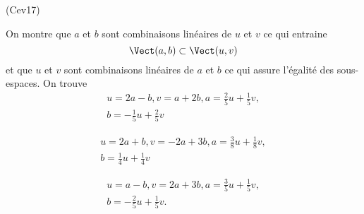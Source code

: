 \begin{tiny}(Cev17)\end{tiny} On montre que $a$ et $b$ sont combinaisons linéaires de $u$ et $v$ ce qui entraine 
\begin{displaymath}
 \Vect(a,b)\subset \Vect(u,v)
\end{displaymath}
et que $u$ et $v$ sont combinaisons linéaires de $a$ et $b$ ce qui assure l'égalité des sous-espaces. On trouve
\begin{multline*}
 u=2a-b, v=a+2b, 
a=\frac{2}{5}u+\frac{1}{5}v,\\ b=-\frac{1}{5}u+\frac{2}{5}v
\end{multline*}

\begin{multline*}
 u=2a+b, v=-2a+3b, 
a=\frac{3}{8}u+\frac{1}{8}v,\\ b=\frac{1}{4}u+\frac{1}{4}v
\end{multline*}

\begin{multline*}
 u=a-b, v=2a+3b, 
a=\frac{3}{5}u+\frac{1}{5}v,\\ b=-\frac{2}{5}u+\frac{1}{5}v .
\end{multline*}

